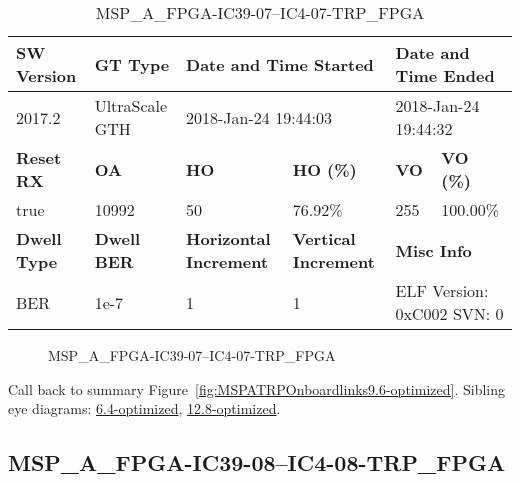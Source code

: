 \begin{table}[h]
\centering
\caption{MSP\_A\_FPGA-IC39-07--IC4-07-TRP\_FPGA}
\label{tab:MSPAFPGAIC3907IC407TRPFPGA9.6-optimized}
\begin{tabular}{@{}|l|l|l|l|l|l|@{}}
\toprule
\textbf{SW Version}                & \textbf{GT Type}   & \multicolumn{2}{l|}{\textbf{Date and Time Started}}            & \multicolumn{2}{l|}{\textbf{Date and Time Ended}}        \\ \midrule
2017.2                       & UltraScale GTH          & \multicolumn{2}{l|}{2018-Jan-24 19:44:03}                   & \multicolumn{2}{l|}{2018-Jan-24 19:44:32}               \\ \midrule
\textbf{Reset RX}                  & \textbf{OA} & \textbf{HO}   & \textbf{HO (\%)} & \textbf{VO} & \textbf{VO (\%)} \\ \midrule
true & 10992        & 50          & 76.92\%        & 255        & 100.00\%       \\ \midrule
\textbf{Dwell Type}                & \textbf{Dwell BER} & \textbf{Horizontal Increment} & \textbf{Vertical Increment}    & \multicolumn{2}{l|}{\textbf{Misc Info}}                  \\ \midrule
BER                            & 1e-7        & 1        & 1           & \multicolumn{2}{l|}{ELF Version: 0xC002 SVN: 0}                         \\ \bottomrule
\end{tabular}
\end{table}

\begin{figure}[h]
\caption{MSP\_A\_FPGA-IC39-07--IC4-07-TRP\_FPGA} \label{fig:MSPAFPGAIC3907IC407TRPFPGA9.6-optimized}
\end{figure}

Call back to summary Figure~\ref{fig:MSPATRPOnboardlinks9.6-optimized}.
Sibling eye diagrams: \hyperref[sec:MSPAFPGAIC3907IC407TRPFPGA6.4-optimized]{6.4-optimized}, \hyperref[sec:MSPAFPGAIC3907IC407TRPFPGA12.8-optimized]{12.8-optimized}.

\clearpage
\newpage


\subsection{MSP\_A\_FPGA-IC39-08--IC4-08-TRP\_FPGA}\label{sec:MSPAFPGAIC3908IC408TRPFPGA9.6-optimized}

